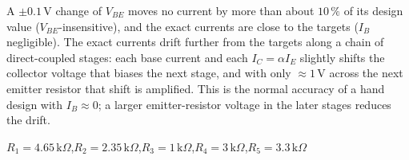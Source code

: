\documentclass[11pt]{article}
\begin{document}
A $\pm0.1$\,V change of $V_{BE}$ moves no current by more than about $10\,\%$ of its design value ($V_{BE}$-insensitive), and the exact currents are close to the targets ($I_B$ negligible). The exact currents drift further from the targets along a chain of direct-coupled stages: each base current and each $I_C = \alpha I_E$ slightly shifts the collector voltage that biases the next stage, and with only $\approx1$\,V across the next emitter resistor that shift is amplified. This is the normal accuracy of a hand design with $I_B\approx0$; a larger emitter-resistor voltage in the later stages reduces the drift.
\begin{ansbox}
$R_{1} = 4.65\,\mathrm{k}\Omega$,\quad $R_{2} = 2.35\,\mathrm{k}\Omega$,\quad $R_{3} = 1\,\mathrm{k}\Omega$,\quad $R_{4} = 3\,\mathrm{k}\Omega$,\quad $R_{5} = 3.3\,\mathrm{k}\Omega$
\end{ansbox}

\newpage
\end{document}
